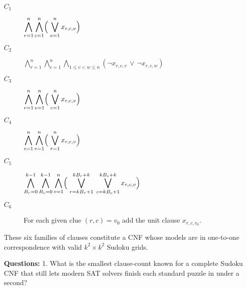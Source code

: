 \documentclass{article}
\theoremstyle{theorem}
\theoremstyle{definition}
\theoremstyle{remark}
\begin{document}
\begin{description}
  \item[$C_1$] $\displaystyle
     \bigwedge_{r=1}^{n}\bigwedge_{c=1}^{n}
       \Bigl(\;\bigvee_{v=1}^{n} x_{r,c,v}\Bigr)$

  \item[$C_2$] $\displaystyle
     \bigwedge_{r=1}^{n}\bigwedge_{c=1}^{n}
       \bigwedge_{1\le v<w\le n}
       (\neg x_{r,c,v}\,\lor\,\neg x_{r,c,w})$

  \item[$C_3$] $\displaystyle
     \bigwedge_{r=1}^{n}\bigwedge_{v=1}^{n}
       \Bigl(\;\bigvee_{c=1}^{n} x_{r,c,v}\Bigr)$

  \item[$C_4$] $\displaystyle
     \bigwedge_{c=1}^{n}\bigwedge_{v=1}^{n}
       \Bigl(\;\bigvee_{r=1}^{n} x_{r,c,v}\Bigr)$

  \item[$C_5$] $\displaystyle
     \bigwedge_{B_r=0}^{k-1}\bigwedge_{B_c=0}^{k-1}\bigwedge_{v=1}^{n}
       \Bigl(\;
         \bigvee_{r=kB_r+1}^{kB_r+k}
         \;\bigvee_{c=kB_c+1}^{kB_c+k}
         x_{r,c,v}\Bigr)$

  \item[$C_6$]  For each given clue $(r,c)=v_{0}$ add the unit clause $x_{r,c,v_{0}}$.
\end{description}

These six families of clauses constitute a CNF whose models are in one-to-one correspondence with valid \(k^{2}\times k^{2}\) Sudoku grids.

\bigskip
\textbf{Questions:} 1. What is the smallest clause-count known for a complete Sudoku CNF that still lets modern SAT solvers finish each standard puzzle in under a second?
\end{document}
